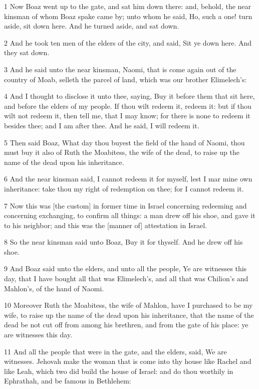 \par 1 Now Boaz went up to the gate, and sat him down there: and, behold, the near kinsman of whom Boaz spake came by; unto whom he said, Ho, such a one! turn aside, sit down here. And he turned aside, and sat down.
\par 2 And he took ten men of the elders of the city, and said, Sit ye down here. And they sat down.
\par 3 And he said unto the near kinsman, Naomi, that is come again out of the country of Moab, selleth the parcel of land, which was our brother Elimelech's:
\par 4 And I thought to disclose it unto thee, saying, Buy it before them that sit here, and before the elders of my people. If thou wilt redeem it, redeem it: but if thou wilt not redeem it, then tell me, that I may know; for there is none to redeem it besides thee; and I am after thee. And he said, I will redeem it.
\par 5 Then said Boaz, What day thou buyest the field of the hand of Naomi, thou must buy it also of Ruth the Moabitess, the wife of the dead, to raise up the name of the dead upon his inheritance.
\par 6 And the near kinsman said, I cannot redeem it for myself, lest I mar mine own inheritance: take thou my right of redemption on thee; for I cannot redeem it.
\par 7 Now this was [the custom] in former time in Israel concerning redeeming and concerning exchanging, to confirm all things: a man drew off his shoe, and gave it to his neighbor; and this was the [manner of] attestation in Israel.
\par 8 So the near kinsman said unto Boaz, Buy it for thyself. And he drew off his shoe.
\par 9 And Boaz said unto the elders, and unto all the people, Ye are witnesses this day, that I have bought all that was Elimelech's, and all that was Chilion's and Mahlon's, of the hand of Naomi.
\par 10 Moreover Ruth the Moabitess, the wife of Mahlon, have I purchased to be my wife, to raise up the name of the dead upon his inheritance, that the name of the dead be not cut off from among his brethren, and from the gate of his place: ye are witnesses this day.
\par 11 And all the people that were in the gate, and the elders, said, We are witnesses. Jehovah make the woman that is come into thy house like Rachel and like Leah, which two did build the house of Israel: and do thou worthily in Ephrathah, and be famous in Bethlehem:
